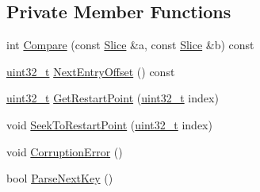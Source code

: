 \subsection*{Private Member Functions}
\begin{DoxyCompactItemize}
\item 
int \hyperlink{classleveldb_1_1_block_1_1_iter_a62e08ca268db6be5bca9a1648f6f854e}{Compare} (const \hyperlink{classleveldb_1_1_slice}{Slice} \&a, const \hyperlink{classleveldb_1_1_slice}{Slice} \&b) const 
\item 
\hyperlink{stdint_8h_a435d1572bf3f880d55459d9805097f62}{uint32\+\_\+t} \hyperlink{classleveldb_1_1_block_1_1_iter_a31bd42263cb99405a0d8fe7cc317fe16}{Next\+Entry\+Offset} () const 
\item 
\hyperlink{stdint_8h_a435d1572bf3f880d55459d9805097f62}{uint32\+\_\+t} \hyperlink{classleveldb_1_1_block_1_1_iter_a80e1396336c859c53790cad6c3cdd543}{Get\+Restart\+Point} (\hyperlink{stdint_8h_a435d1572bf3f880d55459d9805097f62}{uint32\+\_\+t} index)
\item 
void \hyperlink{classleveldb_1_1_block_1_1_iter_a356a5cae58d7f0f816fa366acf0722f5}{Seek\+To\+Restart\+Point} (\hyperlink{stdint_8h_a435d1572bf3f880d55459d9805097f62}{uint32\+\_\+t} index)
\item 
void \hyperlink{classleveldb_1_1_block_1_1_iter_ad8eff43010a2d3e0f30945ede9286521}{Corruption\+Error} ()
\item 
bool \hyperlink{classleveldb_1_1_block_1_1_iter_abb8c89f7256e79148d942ddbc4351775}{Parse\+Next\+Key} ()
\end{DoxyCompactItemize}
